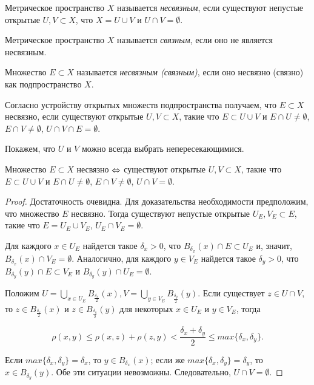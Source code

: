 \begin{definition}
    Метрическое пространство $X$ называется \textit{несвязным}, если существуют непустые открытые $U, V \subset X$, что $X = U \cup V$ и $U \cap V = \emptyset$.

    Метрическое пространство $X$ называется \textit{связным}, если оно не является несвязным.

    Множество $E \subset X$ называется \textit{несвязным (связным)}, если оно несвязно (связно) как подпространство $X$.
\end{definition}

\begin{note}
    Согласно устройству открытых множеств подпространства получаем, что $E \subset X$ несвязно, если существуют открытые $U, V \subset X$, такие что $E \subset U \cup V$ и $E \cap U \neq \emptyset$, $E \cap V \neq \emptyset$, $U \cap V \cap E = \emptyset$.
\end{note}

Покажем, что $U$ и $V$ можно всегда выбрать непересекающимися.

\begin{lemma}
    Множество $E \subset X$ несвязно $\Leftrightarrow$ существуют открытые $U, V \subset X$, такие что $E \subset U \cup V$ и $E \cap U \neq \emptyset$, $E \cap V \neq \emptyset$, $U \cap V = \emptyset$.
\end{lemma}

\begin{proof}
    Достаточность очевидна. Для доказательства необходимости предположим, что множество $E$ несвязно. Тогда существуют непустые открытые $U_{E}, V_{E} \subset E$, такие что $E = U_{E} \cup V_{E}$, $U_{E} \cap V_{E} = \emptyset$.

    Для каждого $x \in U_{E}$ найдется такое $\delta_{x} > 0$, что $B_{\delta_{x}}(x) \cap E \subset U_{E}$ и, значит, $B_{\delta_{x}}(x) \cap V_{E} = \emptyset$. Аналогично, для каждого $y \in V_{E}$ найдется такое $\delta_{y} > 0$, что $B_{\delta_{y}}(y) \cap E \subset V_{E}$ и $B_{\delta_{y}}(y) \cap U_{E} = \emptyset$.

    Положим $U = \underset{x \in U_{E}}{\bigcup} B_{\frac{\delta_{x}}{2}}(x), V = \underset{y \in V_{E}}{\bigcup} B_{\frac{\delta_{y}}{2}}(y)$. Если существует $z \in U \cap V$, то $z \in B_{\frac{\delta_{x}}{2}}(x)$ и $z \in B_{\frac{\delta_{y}}{2}}(y)$ для некоторых $x \in U_{E}$ и $y \in V_{E}$, тогда 

    \[\rho(x, y) \leq \rho(x, z) + \rho(z, y) < \frac{\delta_{x} + \delta_{y}}{2} \leq max\{\delta_{x}, \delta_{y}\}.\]

    Если $max\{\delta_{x}, \delta_{y}\} = \delta_{x}$, то $y \in B_{\delta_{x}}(x)$; если же $max\{\delta_{x}, \delta_{y}\} = \delta_{y}$, то $x \in B_{\delta_{y}}(y)$. Обе эти ситуации невозможны. Следовательно, $U \cap V = \emptyset$.
\end{proof}


